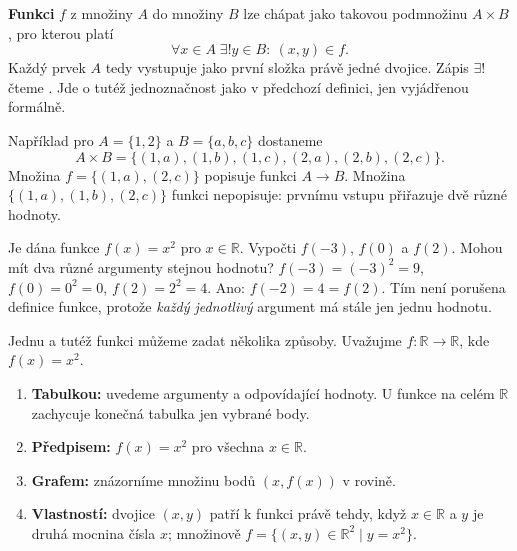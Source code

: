 \documentclass[11pt,a4paper]{article}
\begin{document}
\begin{definiceBox}[title={Definice - Funkce jako relace}]
\textbf{Funkci} $f$ z množiny $A$ do množiny $B$ lze chápat jako takovou
podmnožinu $A\times B$, pro kterou platí
\[
\forall x\in A\;\exists! y\in B:\ (x,y)\in f.
\]
Každý prvek $A$ tedy vystupuje jako první složka právě jedné dvojice.
Zápis $\exists!$ čteme . Jde o tutéž
jednoznačnost jako v předchozí definici, jen vyjádřenou formálně.
\end{definiceBox}

Například pro $A=\{1,2\}$ a $B=\{a,b,c\}$ dostaneme
\[
A\times B=\{(1,a),(1,b),(1,c),(2,a),(2,b),(2,c)\}.
\]
Množina $f=\{(1,a),(2,c)\}$ popisuje funkci $A\to B$.
Množina $\{(1,a),(1,b),(2,c)\}$ funkci nepopisuje: prvnímu vstupu
přiřazuje dvě různé hodnoty.

\begin{prikladReseniBox}[title={Příklad 1}]
Je dána funkce $f(x)=x^2$ pro $x\in\mathbb R$. Vypočti $f(-3)$,
$f(0)$ a $f(2)$. Mohou mít dva různé argumenty stejnou hodnotu?
\tcblower
$ f(-3)=(-3)^2=9$, $f(0)=0^2=0$, $f(2)=2^2=4$.
Ano: $f(-2)=4=f(2)$. Tím není porušena definice funkce, protože
\emph{každý jednotlivý} argument má stále jen jednu hodnotu.
\end{prikladReseniBox}

Jednu a tutéž funkci můžeme zadat několika způsoby.
Uvažujme $f\colon\mathbb R\to\mathbb R$, kde $f(x)=x^2$.

\begin{enumerate}[label=\textbf{\arabic*.},leftmargin=2em,itemsep=1.5pt]
\item \textbf{Tabulkou:} uvedeme argumenty a odpovídající hodnoty.
U funkce na celém $\mathbb R$ zachycuje konečná tabulka jen vybrané body.
\item \textbf{Předpisem:} $f(x)=x^2$ pro všechna $x\in\mathbb R$.
\item \textbf{Grafem:} znázorníme množinu bodů $(x,f(x))$ v rovině.
\item \textbf{Vlastností:} dvojice $(x,y)$ patří k funkci právě tehdy,
když $x\in\mathbb R$ a $y$ je druhá mocnina čísla $x$; množinově
$f=\{(x,y)\in\mathbb R^2\mid y=x^2\}$.
\end{enumerate}
\end{document}
